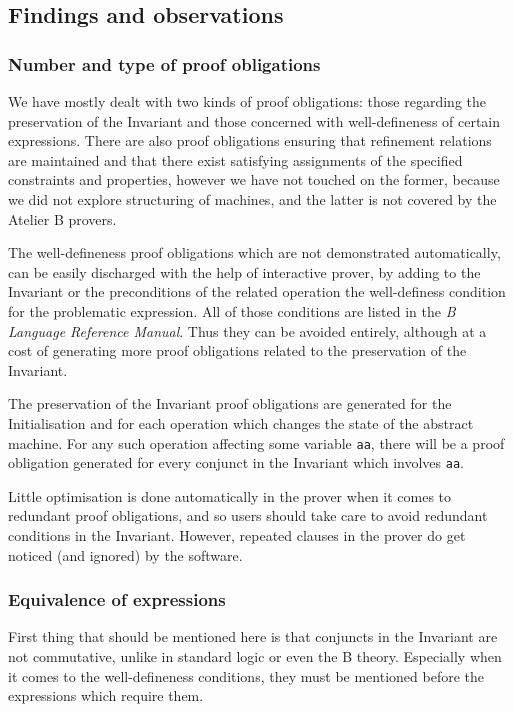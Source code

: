 \documentclass[12pt,journal,duplex]{IEEEtran}
\begin{document}
	\subsection{Findings and observations}
	\subsubsection{Number and type of proof obligations}
	We have mostly dealt with two kinds of proof obligations: those regarding the preservation of the Invariant and those concerned with well-defineness of certain expressions. There are also proof obligations ensuring that refinement relations are maintained and that there exist satisfying assignments of the specified constraints and properties\cite{Sekerinski}, however we have not touched on the former, because we did not explore structuring of machines, and the latter is not covered by the Atelier B provers.

	The well-defineness proof obligations which are not demonstrated automatically, can be easily discharged with the help of interactive prover, by adding to the Invariant or the preconditions of the related operation the well-definess condition for the problematic expression. All of those conditions are listed in the \emph{B Language Reference Manual}. Thus they can be avoided entirely, although at a cost of generating more proof obligations related to the preservation of the Invariant.

	The preservation of the Invariant proof obligations are generated for the Initialisation and for each operation which changes the state of the abstract machine. For any such operation affecting some variable \texttt{aa}, there will be a proof obligation generated for every conjunct in the Invariant which involves \texttt{aa}.

	Little optimisation is done automatically in the prover when it comes to redundant proof obligations, and so users should take care to avoid redundant conditions in the Invariant. However, repeated clauses in the prover do get noticed (and ignored) by the software.

	\subsubsection{Equivalence of expressions}

	First thing that should be mentioned here is that conjuncts in the Invariant are not commutative, unlike in standard logic or even the B theory. Especially when it comes to the well-defineness conditions, they must be mentioned before the expressions which require them.
\end{document}
